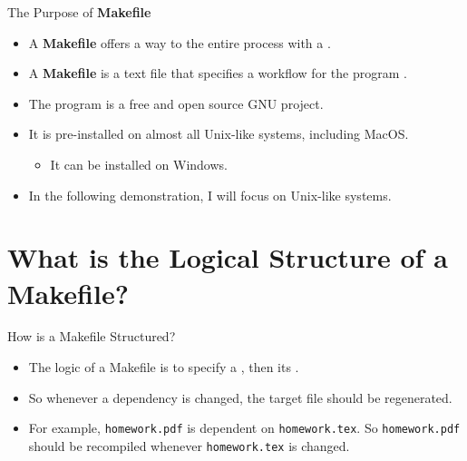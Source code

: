 \documentclass{beamer}
\begin{document}
\begin{frame}{The Purpose of \textbf{Makefile}}
	\begin{itemize}
		\item
			A \textbf{Makefile} offers a way to  the entire process with a .
		\item
			A \textbf{Makefile} is a text file that specifies a workflow for the program .
		\item
			The program \href{https://www.gnu.org/software/make/}{} is a free and open source GNU project.
		\item
			It is pre-installed on almost all Unix-like systems, including MacOS.
			\begin{itemize}
				\item
					It can be installed on Windows.
			\end{itemize}
		\item
			In the following demonstration, I will focus on Unix-like systems.
	\end{itemize}
\end{frame}

\section{What is the Logical Structure of a Makefile?}

\begin{frame}{How is a Makefile Structured?}
	\begin{itemize}
		\item
			The logic of a Makefile is to specify a , then its .
		\item
			So whenever a dependency is changed, the target file should be regenerated.
		\item
			For example, \texttt{homework.pdf} is dependent on \texttt{homework.tex}.
			So \texttt{homework.pdf} should be recompiled whenever \texttt{homework.tex} is changed.
	\end{itemize}
\end{frame}
\end{document}
